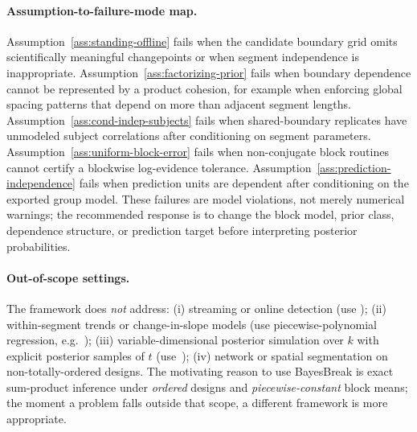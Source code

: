 \paragraph{Assumption-to-failure-mode map.}
Assumption~\ref{ass:standing-offline} fails when the candidate boundary grid omits scientifically meaningful changepoints or when segment independence is inappropriate. Assumption~\ref{ass:factorizing-prior} fails when boundary dependence cannot be represented by a product cohesion, for example when enforcing global spacing patterns that depend on more than adjacent segment lengths. Assumption~\ref{ass:cond-indep-subjects} fails when shared-boundary replicates have unmodeled subject correlations after conditioning on segment parameters. Assumption~\ref{ass:uniform-block-error} fails when non-conjugate block routines cannot certify a blockwise log-evidence tolerance. Assumption~\ref{ass:prediction-independence} fails when prediction units are dependent after conditioning on the exported group model. These failures are model violations, not merely numerical warnings; the recommended response is to change the block model, prior class, dependence structure, or prediction target before interpreting posterior probabilities.

\paragraph{Out-of-scope settings.}
The framework does \emph{not} address: (i) streaming or online detection (use
\citet{adamsmackay2007bocpd}); (ii) within-segment trends or change-in-slope models (use
piecewise-polynomial regression, e.g.\ \citet{ruggieri2014bcpvs}); (iii) variable-dimensional
posterior simulation over $k$ with explicit posterior samples of $t$
(use~\citet{green1995rjMCMC,fearnhead2006exact}); (iv) network or spatial segmentation on
non-totally-ordered designs. The motivating reason to use BayesBreak is exact
sum-product inference under \emph{ordered} designs and \emph{piecewise-constant} block
means; the moment a problem falls outside that scope, a different framework is more
appropriate.

